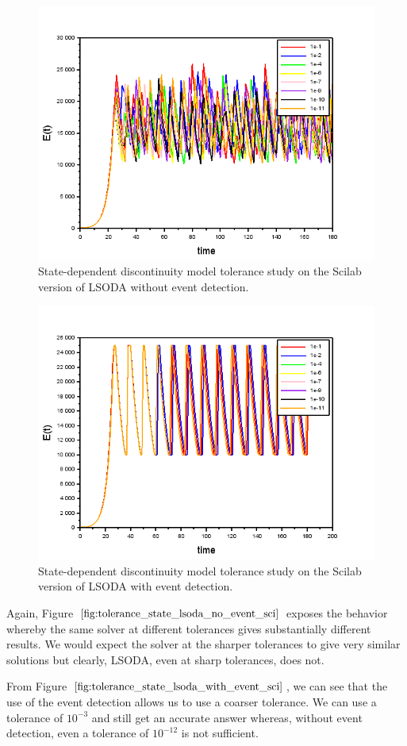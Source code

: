 \begin{figure}[h]
\centering
\includegraphics[width=0.7\linewidth]{./figures/tolerance_state_lsoda_no_event_sci}
\caption{State-dependent discontinuity model tolerance study on the Scilab version of LSODA without event detection.}
\label{fig:tolerance_state_lsoda_no_event_sci}
\end{figure}

\begin{figure}[h]
\centering
\includegraphics[width=0.7\linewidth]{./figures/tolerance_state_lsoda_with_event_sci}
\caption{State-dependent discontinuity model tolerance study on the Scilab version of LSODA with event detection.}
\label{fig:tolerance_state_lsoda_with_event_sci}
\end{figure}

Again, Figure $\ref{fig:tolerance_state_lsoda_no_event_sci}$ exposes the behavior whereby the same solver  at different tolerances gives substantially different results. We would expect the solver at the sharper tolerances to give very similar solutions but clearly, LSODA, even at sharp tolerances, does not.

From Figure $\ref{fig:tolerance_state_lsoda_with_event_sci}$, we can see that the use of the event detection allows us to use a coarser tolerance. We can use a tolerance of $10^{-3}$ and still get an accurate answer whereas, without event detection, even a tolerance of $10^{-12}$ is not sufficient.

